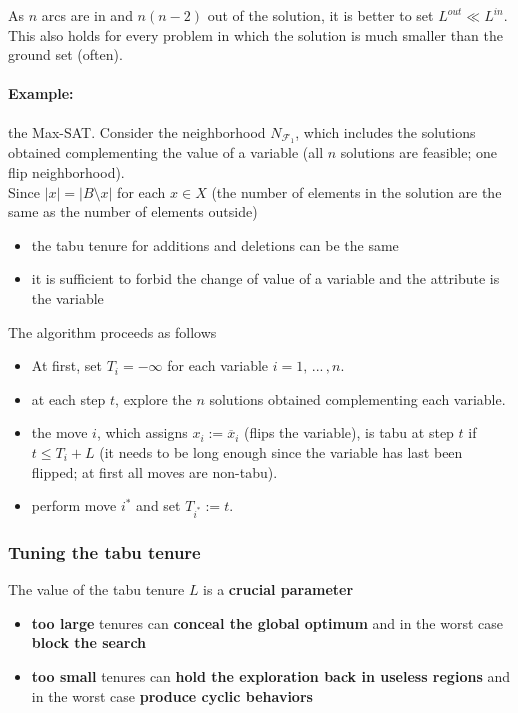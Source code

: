 As $n$ arcs are in and $n(n − 2)$ out of the solution, it is better to set $L^{out} \ll L^{in}$. This also holds for every problem in which the solution is much smaller than the ground set (often).\\

\newpage

\paragraph{Example:} the Max-SAT. Consider the neighborhood $N_{\mathcal{F}_1}$, which includes the solutions obtained complementing the value of a variable (all $n$ solutions are feasible; one flip neighborhood).\\

Since $|x| = |B \setminus x|$ for each $x \in X$ (the number of elements in the solution are the same as the number of elements outside)
\begin{itemize}
	\item the tabu tenure for additions and deletions can be the same
	
	\item it is sufficient to forbid the change of value of a variable and the attribute is the variable
\end{itemize}

The algorithm proceeds as follows
\begin{itemize}
	\item At first, set $T_i = -\infty$ for each variable $i = 1,\, ... \, , n$.\\
	
	\item at each step $t$, explore the $n$ solutions obtained complementing each variable.\\
	
	\item the move $i$, which assigns $x_i := \overline{x}_i$ (flips the variable), is tabu at step $t$ if $t \leq T_i + L$ (it needs to be long enough since the variable has last been flipped; at first all moves are non-tabu).\\
	
	\item perform move $i^\ast$ and set $T_{i^\ast} := t$.\\
\end{itemize}

\newpage

\subsubsection{Tuning the tabu tenure}
The value of the tabu tenure $L$ is a \textbf{crucial parameter}
\begin{itemize}
	\item \textbf{too large} tenures can \textbf{conceal the global optimum} and in the worst case \textbf{block the search}
	
	\item \textbf{too small} tenures can \textbf{hold the exploration back in useless regions} and in the worst case \textbf{produce cyclic behaviors}
\end{itemize}
\nn

